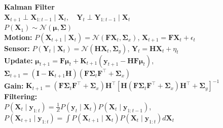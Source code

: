 \begin{framed}
  \textbf{Kalman Filter}\\
  $\mathbf{X}_{t+1} \perp \mathbf{X}_{1:t-1} \mid \mathbf{X}_t, \quad \mathbf{Y}_t \perp \mathbf{Y}_{1:t-1} \mid \mathbf{X}_t$\\
  $P(\mathbf{X}_1) \sim \mathcal{N}(\boldsymbol{\mu}, \boldsymbol{\Sigma})$\\
  \textbf{Motion:} $P(\mathbf{X}_{t+1} \mid \mathbf{X}_t) = \mathcal{N}(\mathbf{F} \mathbf{X}_t, \boldsymbol{\Sigma}_x)$, \quad $\mathbf{X}_{t+1} = \mathbf{F} \mathbf{X}_t + \epsilon_t$\\
  \textbf{Sensor:} $P(\mathbf{Y}_t \mid \mathbf{X}_t) = \mathcal{N}(\mathbf{H} \mathbf{X}_t, \boldsymbol{\Sigma}_y)$, \quad $\mathbf{Y}_t = \mathbf{H} \mathbf{X}_t + \eta_t$\\
  \textbf{Update:} $\boldsymbol{\mu}_{t+1} = \mathbf{F} \boldsymbol{\mu}_t + \mathbf{K}_{t+1}(\mathbf{y}_{t+1} - \mathbf{H} \mathbf{F} \boldsymbol{\mu}_t)$, \\
  $\boldsymbol{\Sigma}_{t+1} = (\mathbf{I} - \mathbf{K}_{t+1} \mathbf{H})(\mathbf{F} \boldsymbol{\Sigma}_t \mathbf{F}^\top + \boldsymbol{\Sigma}_x)$\\
  \textbf{Gain:} $\mathbf{K}_{t+1} = (\mathbf{F} \boldsymbol{\Sigma}_t \mathbf{F}^\top + \boldsymbol{\Sigma}_x) \mathbf{H}^\top [\mathbf{H}(\mathbf{F} \boldsymbol{\Sigma}_t \mathbf{F}^\top + \boldsymbol{\Sigma}_x)\mathbf{H}^\top + \boldsymbol{\Sigma}_y]^{-1}$\\
  \textbf{Filtering:}\\
  $P(\mathbf{X}_t \mid \mathbf{y}_{1:t}) = \frac{1}{Z} P(\mathbf{y}_t \mid \mathbf{X}_t) P(\mathbf{X}_t \mid \mathbf{y}_{1:t-1})$, \\
  $P(\mathbf{X}_{t+1} \mid \mathbf{y}_{1:t}) = \int P(\mathbf{X}_{t+1} \mid \mathbf{X}_t) P(\mathbf{X}_t \mid \mathbf{y}_{1:t}) d\mathbf{X}_t$
\end{framed}
